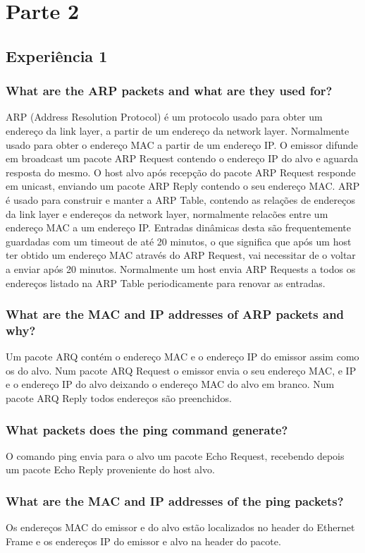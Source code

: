 \documentclass[a4paper]{article}
\begin{document}
\section{Parte 2}
\subsection{Experiência 1}

\subsubsection{What are the ARP packets and what are they used for?}
ARP (Address Resolution Protocol) é um protocolo usado para obter um endereço da link layer, a partir de um endereço da network layer. Normalmente usado para obter o endereço MAC a partir de um endereço IP. O emissor difunde em broadcast um pacote ARP Request contendo o endereço IP do alvo e aguarda resposta do mesmo. O host alvo após recepção do pacote ARP Request responde em unicast, enviando um pacote ARP Reply contendo o seu endereço MAC. ARP é usado para construir e manter a ARP Table, contendo as relações de endereços da link layer e endereços da network layer, normalmente relacões entre um endereço MAC a um endereço IP. Entradas dinâmicas desta são frequentemente guardadas com um timeout de até 20 minutos, o que significa que após um host ter obtido um endereço MAC através do ARP Request, vai necessitar de o voltar a enviar após 20 minutos. Normalmente um host envia ARP Requests a todos os endereços listado na ARP Table periodicamente para renovar as entradas.

\subsubsection{What are the MAC and IP addresses of ARP packets and why?}
Um pacote ARQ contém o endereço MAC e o endereço IP do emissor assim como os do alvo. Num pacote ARQ Request o emissor envia o seu endereço MAC, e IP e o endereço IP do alvo deixando o endereço MAC do alvo em branco. Num pacote ARQ Reply todos endereços são preenchidos.

\subsubsection{What packets does the ping command generate?}
O comando ping envia para o alvo um pacote Echo Request, recebendo depois um pacote Echo Reply proveniente do host alvo.

\subsubsection{What are the MAC and IP addresses of the ping packets?}
Os endereços MAC do emissor e do alvo estão localizados no header do Ethernet Frame e os endereços IP do emissor e alvo na header do pacote.
\end{document}
